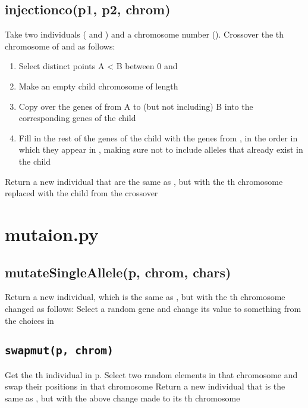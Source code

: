 \documentclass[letterpaper,10pt,english]{sphinxmanual}
\begin{document}
\section{injectionco(p1, p2, chrom)}
\label{crossover.py:injectionco-p1-p2-chrom}
Take two individuals ( and  ) and a chromosome number ().
Crossover the  th chromosome of  and  as follows:
\begin{enumerate}
\item {} 
Select distinct points A \textless{} B between 0 and 

\item {} 
Make an empty child chromosome of length 

\item {} 
Copy over the genes of  from A to (but not including) B into the corresponding genes of the child

\item {} 
Fill in the rest of the genes of the child with the genes from , in the order in which they appear in , making sure not to include alleles that already exist in the child

\end{enumerate}

Return a new individual that are the same as  , but with the  th chromosome replaced with the child from the crossover


\chapter{mutaion.py}
\label{mutation.py:mutaion-py}\label{mutation.py::doc}

\section{mutateSingleAllele(p, chrom, chars)}
\label{mutation.py:mutatesingleallele-p-chrom-chars}
Return a new individual, which is the same as , but with the  th chromosome changed as follows:
Select a random gene and change its value to something from the choices in 


\section{\texttt{swapmut(p, chrom)}}
\label{mutation.py:swapmut-p-chrom}
Get the  th individual in p. Select two random elements in that chromosome and swap their positions in that chromosome
Return a new individual that is the same as , but with the above change made to its  th chromosome
\end{document}
